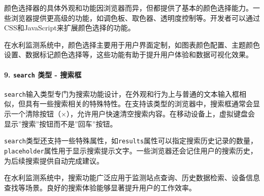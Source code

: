 颜色选择器的具体外观和功能因浏览器而异，但都提供了基本的颜色选择能力。一些浏览器提供更高级的功能，如调色板、取色器、透明度控制等。开发者可以通过CSS和JavaScript来扩展颜色选择的功能。

在水利监测系统中，颜色选择主要用于用户界面定制，如图表颜色配置、主题颜色设置、数据标记颜色选择等，这些功能有助于提升用户体验和数据可视化效果。

\begin{Shaded}
\begin{Highlighting}[]
\DataTypeTok{\textless{}}\OperatorTok{=}\DataTypeTok{\textgreater{}}\DataTypeTok{\textless{}/}\DataTypeTok{\textgreater{}}
\DataTypeTok{\textless{}}\OperatorTok{=}\OtherTok{ }
\OperatorTok{=}\OtherTok{ }
\OperatorTok{=}\OtherTok{ }
\OperatorTok{=}
\OperatorTok{=}\DataTypeTok{\textgreater{}}
\end{Highlighting}
\end{Shaded}

\paragraph{\texorpdfstring{9. \texttt{search} 类型 - 搜索框}{9. search 类型 - 搜索框}}\label{search-ux7c7bux578b---ux641cux7d22ux6846}

\texttt{search}输入类型专门为搜索功能设计，在外观和行为上与普通的文本输入框相似，但具有一些搜索相关的特殊特性。在支持该类型的浏览器中，搜索框通常会显示一个清除按钮（×），允许用户快速清空搜索内容。在移动设备上，虚拟键盘会显示''搜索''按钮而不是''回车''按钮。

\texttt{search}类型还支持一些特殊属性，如\texttt{results}属性可以指定搜索历史记录的数量，\texttt{placeholder}属性用于显示搜索提示文字。一些浏览器还会记住用户的搜索历史，为后续搜索提供自动完成建议。

在水利监测系统中，搜索功能广泛应用于监测站点查询、历史数据检索、设备信息查找等场景。良好的搜索体验能够显著提升用户的工作效率。

\begin{Shaded}
\begin{Highlighting}[]
\DataTypeTok{\textless{}}\OperatorTok{=}\DataTypeTok{\textgreater{}}\DataTypeTok{\textless{}/}\DataTypeTok{\textgreater{}}
\DataTypeTok{\textless{}}\OperatorTok{=}\OtherTok{ }
\OperatorTok{=}\OtherTok{ }
\OperatorTok{=}\OtherTok{ }
\OperatorTok{=}
\OperatorTok{=}
\OperatorTok{=}\DataTypeTok{\textgreater{}}
\end{Highlighting}
\end{Shaded}

